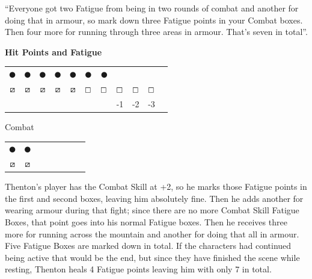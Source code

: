 \begin{multicols}{2}
{\begin{exampletext}
		``Everyone got two Fatigue from being in two \glspl{round} of combat and another for doing that in armour, so mark down three Fatigue points in your Combat boxes. Then four more for running through three areas in armour. That's seven in total''.

\vspace{1em}

\textbf{Hit Points and Fatigue}

	\begin{tabularx}{\linewidth}{ccccccccccc}

		$\CIRCLE$ & $\CIRCLE$ & $\CIRCLE$ & $\CIRCLE$ & $\CIRCLE$ & $\CIRCLE$ & $\CIRCLE$ & \Circle & \Circle & \Circle \\ 

		$\boxslash$ & $\boxslash$ & $\boxslash$ & $\boxslash$ & $\boxslash$ & $\boxempty$ & $\boxempty$ & $\boxempty$ & $\boxempty$ & $\boxempty$ \\ 

		&&&&&&& -1 & -2 & -3 \\

	\end{tabularx}

	Combat 

	\begin{tabularx}{.4\textwidth}{cccccccc}


		$\CIRCLE$ & $\CIRCLE$ \\ 

		$\boxslash$ & $\boxslash$ \\ 

	\end{tabularx}

\vspace{1em}

	Thenton's player has the Combat Skill at +2, so he marks those Fatigue points in the first and second boxes, leaving him absolutely fine. Then he adds another for wearing armour during that fight; since there are no more Combat Skill Fatigue Boxes, that point goes into his normal Fatigue boxes. Then he receives three more for running across the mountain and another for doing that all in armour. Five Fatigue Boxes are marked down in total. If the characters had continued being active that would be the end, but since they have finished the scene while resting, Thenton heals 4 Fatigue points leaving him with only 7 in total.


\end{exampletext}}
\end{multicols}
